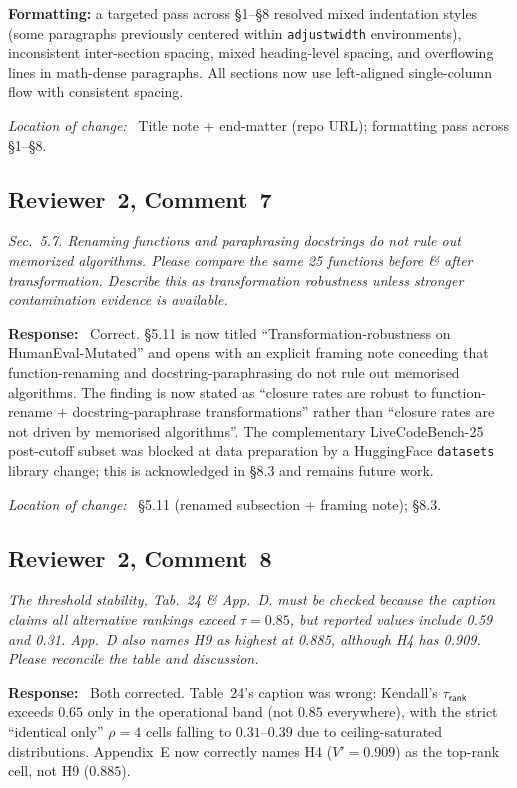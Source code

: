 \documentclass[11pt,a4paper]{article}
\newenvironment{reviewerquote}
  {\begin{tcolorbox}[colback=black!5, colframe=black!15, boxrule=0.3pt,
                     arc=1pt, left=6pt, right=6pt, top=3pt, bottom=3pt,
                     breakable]\itshape\small}
  {\end{tcolorbox}}
\newcommand{\rcomment}[2]{\subsection*{Reviewer~#1, Comment~#2}}
\newcommand{\response}{\noindent\textbf{Response:}\ }
\newcommand{\loc}{\par\smallskip\noindent\textit{Location of change:}\ }
\begin{document}
\textbf{Formatting:} a targeted pass across \S1--\S8 resolved mixed indentation styles (some paragraphs previously centered within \texttt{adjustwidth} environments), inconsistent inter-section spacing, mixed heading-level spacing, and overflowing lines in math-dense paragraphs. All sections now use left-aligned single-column flow with consistent spacing.

\loc{} Title note + end-matter (repo URL); formatting pass across \S1--\S8.

\rcomment{2}{7}

\begin{reviewerquote}
Sec.\ 5.7. Renaming functions and paraphrasing docstrings do not rule out memorized algorithms. Please compare the same 25 functions before \& after transformation. Describe this as transformation robustness unless stronger contamination evidence is available.
\end{reviewerquote}

\response{}
Correct. \S5.11 is now titled ``Transformation-robustness on HumanEval-Mutated'' and opens with an explicit framing note conceding that function-renaming and docstring-paraphrasing do not rule out memorised algorithms. The finding is now stated as ``closure rates are robust to function-rename + docstring-paraphrase transformations'' rather than ``closure rates are not driven by memorised algorithms''. The complementary LiveCodeBench-25 post-cutoff subset was blocked at data preparation by a HuggingFace \texttt{datasets} library change; this is acknowledged in \S8.3 and remains future work.

\loc{} \S5.11 (renamed subsection + framing note); \S8.3.

\rcomment{2}{8}

\begin{reviewerquote}
The threshold stability, Tab.\ 24 \& App.\ D. must be checked because the caption claims all alternative rankings exceed $\tau = 0.85$, but reported values include 0.59 and 0.31. App.\ D also names H9 as highest at 0.885, although H4 has 0.909. Please reconcile the table and discussion.
\end{reviewerquote}

\response{}
Both corrected. Table~24's caption was wrong: Kendall's $\tau_{\textsf{rank}}$ exceeds $0.65$ only in the operational band (not $0.85$ everywhere), with the strict ``identical only'' $\rho = 4$ cells falling to $0.31$--$0.39$ due to ceiling-saturated distributions. Appendix~E now correctly names H4 ($V' = 0.909$) as the top-rank cell, not H9 ($0.885$).
\end{document}
